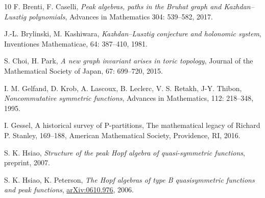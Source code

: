\documentclass[11pt]{amsart}
\numberwithin{equation}{section}
\begin{document}
\begin{thebibliography}{10}
 F. Brenti, F. Caselli,
\newblock \textit{Peak algebras, paths in the Bruhat graph and Kazhdan–Lusztig polynomials}, 
\newblock Advances in Mathematics 304: 539--582, 2017.


 J.-L. Brylinski, M. Kashiwara,
\newblock\textit{ Kazhdan–Lusztig conjecture and holonomic system}, Inventiones Mathematicae, 
64: 387--410,  1981.


 S. Choi, H. Park, 
\newblock \textit{A new graph invariant arises in toric topology},
\newblock Journal of the Mathematical Society of Japan, 67: 699--720, 2015.







 I. M. Gelfand, D. Krob, A. Lascoux, B. Leclerc, V. S. Retakh, J-Y. Thibon,
\newblock \textit{Noncommutative symmetric functions},
\newblock Advances in Mathematics, 112: 218--348, 1995.

 I. Gessel, A historical survey of P-partitions, The mathematical legacy of Richard P. Stanley,
169–188, American Mathematical Society, Providence, RI, 2016.

%
%




 S. K. Hsiao,
\newblock \textit{Structure of the peak Hopf algebra of quasi-symmetric functions},
\newblock preprint, 2007.

 S. K. Hsiao, K. Peterson,
\newblock \textit{The Hopf algebras of type B quasisymmetric functions and peak functions},
\newblock \href{https://arxiv.org/abs/math/0610.976}{arXiv:0610.976}, 2006.




\end{thebibliography}
\end{document}

